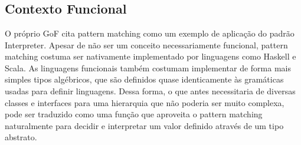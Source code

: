 \begin{lstlisting}[caption={Interpreter Orientação a Objetos},label=oointerpreter]


    
\end{lstlisting}

\subsection*{Contexto Funcional}

O próprio GoF cita pattern matching como um exemplo de 
aplicação do padrão Interpreter. Apesar de não ser um 
conceito necessariamente funcional, pattern matching costuma 
ser nativamente implementado por linguagens como Haskell e 
Scala. As linguagens funcionais também costumam implementar 
de forma mais simples tipos algébricos, que são definidos 
quase identicamente às gramáticas usadas para definir 
linguagens. Dessa forma, o que antes necessitaria de diversas 
classes e interfaces para uma hierarquia que não poderia 
ser muito complexa, pode ser traduzido como uma função 
que aproveita o pattern matching naturalmente para decidir 
e interpretar um valor definido através de um tipo abstrato.

\begin{lstlisting}[caption={Interpreter Funcional},label=fpinterpreter]
    

    
\end{lstlisting}